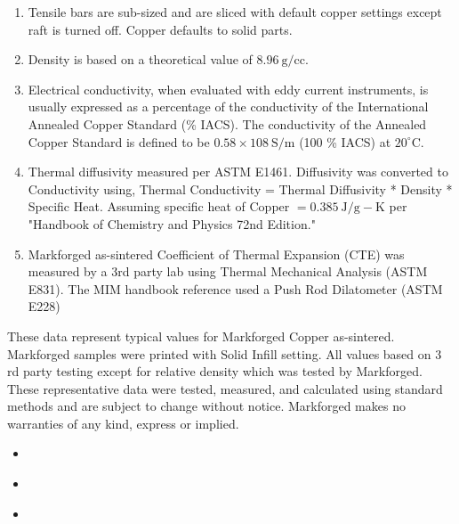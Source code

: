 \documentclass[10pt]{article}
\begin{document}
\begin{enumerate}
  \item Tensile bars are sub-sized and are sliced with default copper settings except raft is turned off. Copper defaults to solid parts.

  \item Density is based on a theoretical value of $8.96 \mathrm{~g} / \mathrm{cc}$.

  \item Electrical conductivity, when evaluated with eddy current instruments, is usually expressed as a percentage of the conductivity of the International Annealed Copper Standard (\% IACS). The conductivity of the Annealed Copper Standard is defined to be $0.58 \times 108 \mathrm{~S} / \mathrm{m}$ (100 \% IACS) at $20^{\circ} \mathrm{C}$.

  \item Thermal diffusivity measured per ASTM E1461. Diffusivity was converted to Conductivity using, Thermal Conductivity = Thermal Diffusivity * Density * Specific Heat. Assuming specific heat of Copper $=0.385 \mathrm{~J} / \mathrm{g}-\mathrm{K}$ per "Handbook of Chemistry and Physics 72nd Edition."

  \item Markforged as-sintered Coefficient of Thermal Expansion (CTE) was measured by a 3rd party lab using Thermal Mechanical Analysis (ASTM E831). The MIM handbook reference used a Push Rod Dilatometer (ASTM E228)

\end{enumerate}

These data represent typical values for Markforged Copper as-sintered. Markforged samples were printed with Solid Infill setting. All values based on 3 rd party testing except for relative density which was tested by Markforged. These representative data were tested, measured, and calculated using standard methods and are subject to change without notice. Markforged makes no warranties of any kind, express or implied.

\begin{itemize}
  \item 
\end{itemize}

\begin{itemize}
  \item 
\end{itemize}

\begin{itemize}
  \item 
\end{itemize}
\end{document}

